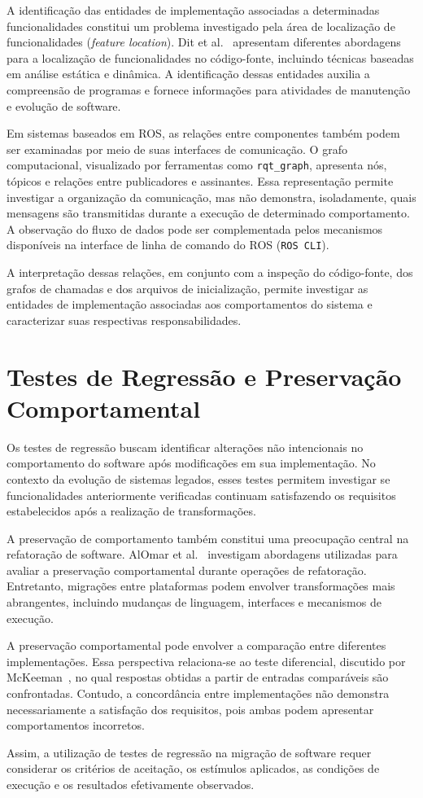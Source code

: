 A identificação das entidades de implementação associadas a determinadas funcionalidades constitui um problema investigado pela área de localização de funcionalidades (\textit{feature location}). Dit et al.~\cite{Dit2013} apresentam diferentes abordagens para a localização de funcionalidades no código-fonte, incluindo técnicas baseadas em análise estática e dinâmica. A identificação dessas entidades auxilia a compreensão de programas e fornece informações para atividades de manutenção e evolução de software.

Em sistemas baseados em ROS, as relações entre componentes também podem ser examinadas por meio de suas interfaces de comunicação. O grafo computacional, visualizado por ferramentas como \texttt{rqt\_graph}, apresenta nós, tópicos e relações entre publicadores e assinantes. Essa representação permite investigar a organização da comunicação, mas não demonstra, isoladamente, quais mensagens são transmitidas durante a execução de determinado comportamento. A observação do fluxo de dados pode ser complementada pelos mecanismos disponíveis na interface de linha de comando do ROS (\texttt{ROS CLI}).

A interpretação dessas relações, em conjunto com a inspeção do código-fonte, dos grafos de chamadas e dos arquivos de inicialização, permite investigar as entidades de implementação associadas aos comportamentos do sistema e caracterizar suas respectivas responsabilidades.

\section{Testes de Regressão e Preservação Comportamental}

Os testes de regressão buscam identificar alterações não intencionais no comportamento do software após modificações em sua implementação. No contexto da evolução de sistemas legados, esses testes permitem investigar se funcionalidades anteriormente verificadas continuam satisfazendo os requisitos estabelecidos após a realização de transformações.

A preservação de comportamento também constitui uma preocupação central na refatoração de software. AlOmar et al.~\cite{AlOmar2021} investigam abordagens utilizadas para avaliar a preservação comportamental durante operações de refatoração. Entretanto, migrações entre plataformas podem envolver transformações mais abrangentes, incluindo mudanças de linguagem, interfaces e mecanismos de execução.

A preservação comportamental pode envolver a comparação entre diferentes implementações. Essa perspectiva relaciona-se ao teste diferencial, discutido por McKeeman~\cite{McKeeman1998}, no qual respostas obtidas a partir de entradas comparáveis são confrontadas. Contudo, a concordância entre implementações não demonstra necessariamente a satisfação dos requisitos, pois ambas podem apresentar comportamentos incorretos.

Assim, a utilização de testes de regressão na migração de software requer considerar os critérios de aceitação, os estímulos aplicados, as condições de execução e os resultados efetivamente observados.



